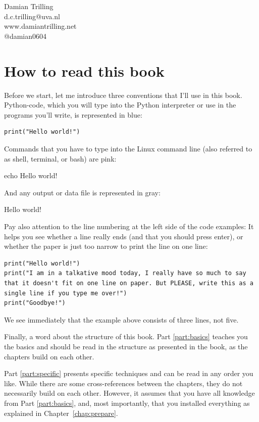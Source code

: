 \documentclass[a4paper,12pt]{book}
\begin{document}
\begin{flushright}
~\\~\\Damian Trilling\\
d.c.trilling@uva.nl\\
www.damiantrilling.net\\
@damian0604

\end{flushright}

\chapter{How to read this book}
\label{howtoread}

Before we start, let me introduce three conventions that I'll use in this book. Python-code, which you will type into the Python interpreter or use in the programs you'll write, is represented in blue:
\begin{lstlisting}
print("Hello world!")
\end{lstlisting}
Commands that you have to type into the Linux command line (also referred to as shell, terminal, or bash) are pink:
\begin{lstlistingbash}
echo Hello world!
\end{lstlistingbash}
And any output or data file is represented in gray:
\begin{lstlistingoutput}
Hello world!
\end{lstlistingoutput}

Pay also attention to the line numbering at the left side of the code examples: It helps you see whether a line really ends (and that you should press enter), or whether the paper is just too narrow to print the line on one line:

\begin{lstlisting}
print("Hello world!")
print("I am in a talkative mood today, I really have so much to say that it doesn't fit on one line on paper. But PLEASE, write this as a single line if you type me over!")
print("Goodbye!")
\end{lstlisting}

We see immediately that the example above consists of three lines, not five.

Finally, a word about the structure of this book. Part \ref{part:basics} teaches you the basics and should be read in the structure as presented in the book, as the chapters build on each other. 

Part \ref{part:specific} presents specific techniques and can be read in any order you like. While there are some cross-references between the chapters, they do not necessarily build on each other. However, it assumes that you have all knowledge from Part \ref{part:basics}, and, most importantly, that you installed everything as explained in Chapter~\ref{chap:prepare}.
\end{document}
